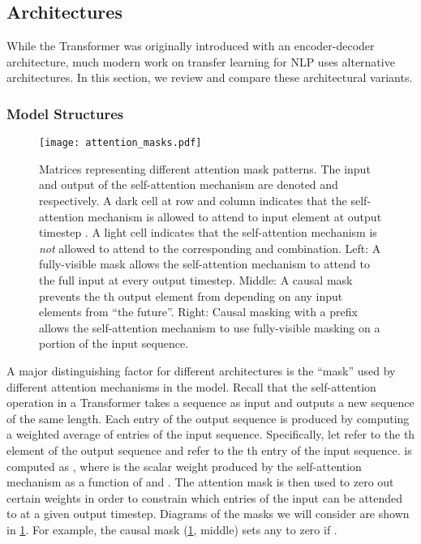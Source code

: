 \documentclass[twoside,11pt]{article}
\begin{document}
\subsection{Architectures}
\label{sec:architectures}

While the Transformer was originally introduced with an encoder-decoder architecture, much modern work on transfer learning for NLP uses alternative architectures.
In this section, we review and compare these architectural variants.

\subsubsection{Model Structures}
\label{sec:structures}

\begin{figure}[t]
    \centering
    \texttt{[image: attention\_masks.pdf]}
    \caption{
    Matrices representing different attention mask patterns.
    The input and output of the self-attention mechanism are denoted  and  respectively.
    A dark cell at row  and column  indicates that the self-attention mechanism is allowed to attend to input element  at output timestep .
    A light cell indicates that the self-attention mechanism is \textit{not} allowed to attend to the corresponding  and  combination.
    Left: A fully-visible mask allows the self-attention mechanism to attend to the full input at every output timestep.
    Middle: A causal mask prevents the th output element from depending on any input elements from ``the future''.
    Right: Causal masking with a prefix allows the self-attention mechanism to use fully-visible masking on a portion of the input sequence.
    }
    \label{fig:attention_masks}
\end{figure}

A major distinguishing factor for different architectures is the ``mask'' used by different attention mechanisms in the model.
Recall that the self-attention operation in a Transformer takes a sequence as input and outputs a new sequence of the same length.
Each entry of the output sequence is produced by computing a weighted average of entries of the input sequence.
Specifically, let  refer to the th element of the output sequence and  refer to the th entry of the input sequence.
 is computed as , where  is the scalar weight produced by the self-attention mechanism as a function of  and .
The attention mask is then used to zero out certain weights in order to constrain which entries of the input can be attended to at a given output timestep.
Diagrams of the masks we will consider are shown in \cref{fig:attention_masks}.
For example, the causal mask (\cref{fig:attention_masks}, middle) sets any  to zero if .
\end{document}
